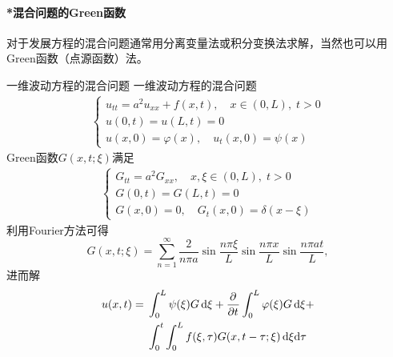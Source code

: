 \paragraph{*混合问题的Green函数}对于发展方程的混合问题通常用分离变量法或积分变换法求解，当然也可以用Green函数（点源函数）法。
\begin{example}{一维波动方程的混合问题}{}
	一维波动方程的混合问题
	\begin{align*}
		\begin{cases}
			u_{tt} = a^2u_{xx} + f(x,t),\quad x \in (0,L),\;t > 0\\
			u(0,t) = u(L,t) = 0\\
			u(x,0) = \varphi(x),\quad u_t(x,0) = \psi(x)
		\end{cases}
	\end{align*}
	Green函数$G(x,t;\xi)$满足 
	\begin{align*}
		\begin{cases}
			G_{tt} = a^2G_{xx},\quad x,\xi \in (0,L),\;t > 0\\
			G(0,t) = G(L,t) = 0\\
			G(x,0) = 0,\quad G_t(x,0) = \delta(x - \xi)
		\end{cases}
	\end{align*}
	利用Fourier方法可得
	\begin{equation}
		\label{eq:mmp-mixed-string-retarded-green}
		G(x,t;\xi) = \sum_{n=1}^\infty\frac2{n\pi a}\sin\frac{n\pi\xi}L\sin\frac{n\pi x}L\sin\frac{n\pi at}L,
	\end{equation}
	进而解
	\begin{align}
		\begin{aligned}
			u(x,t) = {}&\int_0^L\psi(\xi)G\mathop{}\!\mathrm{d}\xi + \frac{\partial^{}}{\partial{t}^{}}\int_0^L\varphi(\xi)G\mathop{}\!\mathrm{d}\xi +\\
			&\int_0^t\int_0^L f(\xi,\tau)G(x,t - \tau;\xi)\mathop{}\!\mathrm{d}\xi\mathrm{d}\tau
		\end{aligned}
	\end{align}
\end{example}

% 
